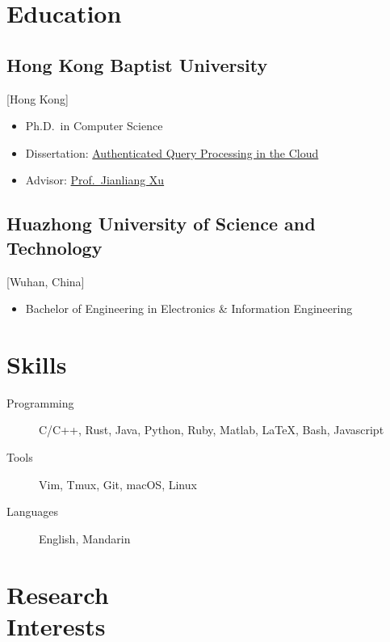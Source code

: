 \documentclass{mycv}
\begin{document}
\section{Education}

\subsection{Hong Kong Baptist University}[Hong Kong]
\vspace{-\parskip}%
\begin{itemize}[label={}]
  \item Ph.D.\ in Computer Science 
  \item Dissertation: \href{https://scholars.hkbu.edu.hk/en/studentTheses/authenticated-query-processing-in-the-cloud}{Authenticated Query Processing in the Cloud}
  \item Advisor: \href{https://www.comp.hkbu.edu.hk/~xujl}{Prof.~Jianliang Xu}
\end{itemize}

\subsection{Huazhong University of Science and Technology}[Wuhan, China]
\vspace{-\parskip}%
\begin{itemize}[label={}]
  \item Bachelor of Engineering in Electronics \& Information Engineering 
\end{itemize}

\section{Skills}

\begin{description}
  \item[Programming] C/C++, Rust, Java, Python, Ruby, Matlab, \LaTeX, Bash, Javascript
  \item[Tools] Vim, Tmux, Git, macOS, Linux
  \item[Languages] English, Mandarin
\end{description}

\section{Research \\ Interests}
\end{document}
